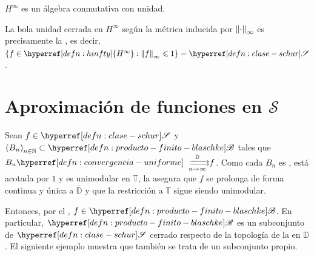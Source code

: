 \begin{cor}
    $\hyperref[defn:hinfty]{H^\infty}$ es un álgebra conmutativa con unidad.
\end{cor}



\begin{obs}\label{obs:hinfty-bola-unidad}
    La bola unidad cerrada en $\hyperref[defn:hinfty]{H^\infty}$ según la métrica inducida por $\left\Vert\cdot\right\Vert_{\infty}$ es precisamente la , es decir, $\left\{f \in \hyperref[defn:hinfty]{H^\infty} : \norm{f}_{\infty} \leq 1\right\} = \exhyperref[defn:clase-schur]{clase-schur}{\mathscr{S}}$.
\end{obs}

\section{Aproximación de funciones en $\mathscr{S}$}

\begin{obs}
    Sean $f \in \exhyperref[defn:clase-schur]{clase-schur}{\mathscr{S}}$ y $\left(B_n\right)_{n \in \N} \subset \exhyperref[defn:producto-finito-blaschke]{producto-finito-blaschke}{\mathscr{B}}$ tales que $B_n \exhyperref[defn:convergencia-uniforme]{convergencia-uniforme}{\xrightrightarrows[n \to \infty]{\mathbb{D}}} f$. Como cada $B_n$ es , está acotada por $1$ y es unimodular en $\mathbb{T}$, la  asegura que $f$ se prolonga de forma continua y única a $\bar{\mathbb{D}}$ y que la restricción a $\mathbb{T}$ sigue siendo unimodular.
    
    Entonces, por el , $f \in \exhyperref[defn:producto-finito-blaschke]{producto-finito-blaschke}{\mathscr{B}}$. En particular, $\exhyperref[defn:producto-finito-blaschke]{producto-finito-blaschke}{\mathscr{B}}$ es un subconjunto de $\exhyperref[defn:clase-schur]{clase-schur}{\mathscr{S}}$ cerrado respecto de la topología de la  en $\mathbb{D}$. El siguiente ejemplo muestra que también se trata de un subconjunto propio.
\end{obs}

